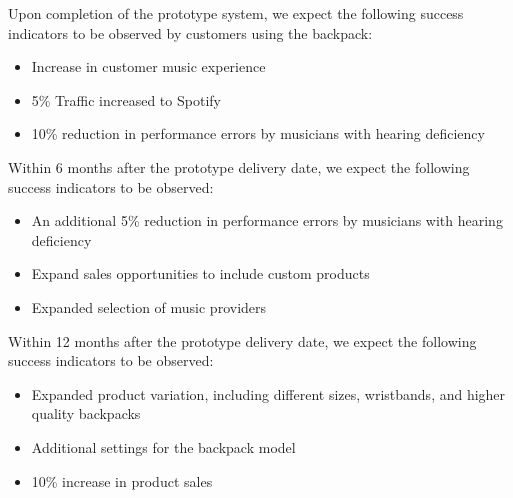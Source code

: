 

Upon completion of the prototype system, we expect the following success indicators to be observed by customers using the backpack:
\begin{itemize}
  \item Increase in customer music experience 
  \item 5\% Traffic increased to Spotify 
  \item 10\% reduction in performance errors by musicians with hearing deficiency
\end{itemize}

Within 6 months after the prototype delivery date, we expect the following success indicators to be observed:
\begin{itemize}
  \item An additional 5\% reduction in performance errors by musicians with hearing deficiency
  \item Expand sales opportunities to include custom products
  \item Expanded selection of music providers
\end{itemize}

Within 12 months after the prototype delivery date, we expect the following success indicators to be observed:
\begin{itemize}
  \item Expanded product variation, including different sizes, wristbands, and higher quality backpacks
  \item Additional settings for the backpack model 
  \item 10\% increase in product sales
\end{itemize}



